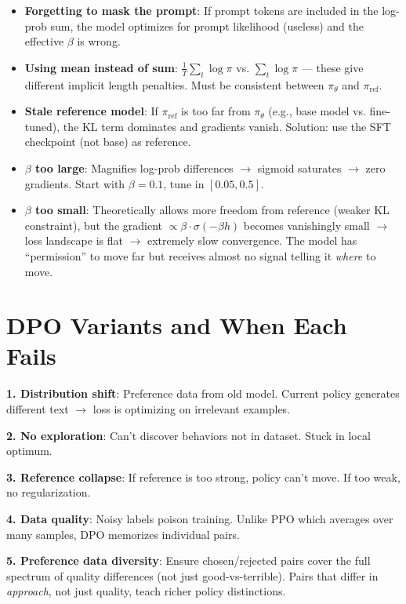 \begin{warningbox}
\begin{itemize}
  \item \textbf{Forgetting to mask the prompt}: If prompt tokens are included in the log-prob sum, the model optimizes for prompt likelihood (useless) and the effective $\beta$ is wrong.
  \item \textbf{Using mean instead of sum}: $\frac{1}{T}\sum_t \log\pi$ vs. $\sum_t \log\pi$ --- these give different implicit length penalties. Must be consistent between $\pi_\theta$ and $\pi_{\text{ref}}$.
  \item \textbf{Stale reference model}: If $\pi_{\text{ref}}$ is too far from $\pi_\theta$ (e.g., base model vs. fine-tuned), the KL term dominates and gradients vanish. Solution: use the SFT checkpoint (not base) as reference.
  \item \textbf{$\beta$ too large}: Magnifies log-prob differences $\rightarrow$ sigmoid saturates $\rightarrow$ zero gradients. Start with $\beta = 0.1$, tune in $[0.05, 0.5]$.
  \item \textbf{$\beta$ too small}: Theoretically allows more freedom from reference (weaker KL constraint), but the gradient $\propto \beta \cdot \sigma(-\beta h)$ becomes vanishingly small $\rightarrow$ loss landscape is flat $\rightarrow$ extremely slow convergence. The model has ``permission'' to move far but receives almost no signal telling it \emph{where} to move.
\end{itemize}
\end{warningbox}

\section{DPO Variants and When Each Fails}
\label{dpo-variants-and-when-each-fails}

\begin{warningbox}
\textbf{1. Distribution shift}: Preference data from old model. Current policy generates different text $\rightarrow$ loss is optimizing on irrelevant examples.

\textbf{2. No exploration}: Can’t discover behaviors not in dataset. Stuck in local optimum.

\textbf{3. Reference collapse}: If reference is too strong, policy can’t move. If too weak, no regularization.

\textbf{4. Data quality}: Noisy labels poison training. Unlike PPO which averages over many samples, DPO memorizes individual pairs.

\textbf{5. Preference data diversity}: Ensure chosen/rejected pairs cover the full spectrum of quality differences (not just good-vs-terrible). Pairs that differ in \emph{approach}, not just quality, teach richer policy distinctions.
\end{warningbox}

